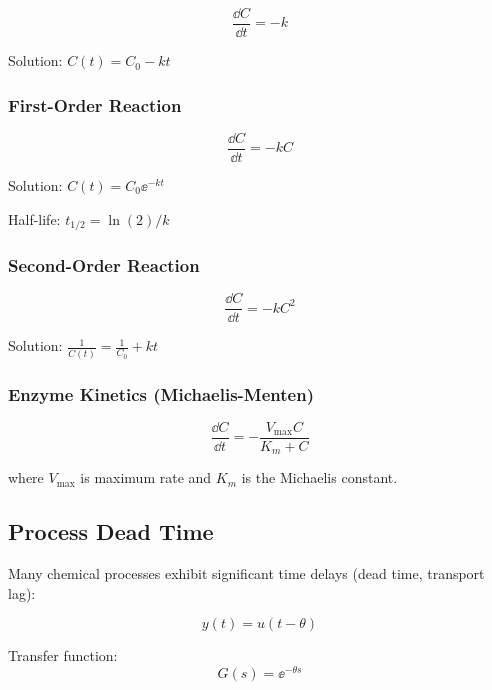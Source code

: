 \begin{equation}
\frac{\dd C}{\dd t} = -k
\end{equation}

Solution: $C(t) = C_0 - kt$

\subsubsection{First-Order Reaction}

\begin{equation}
\frac{\dd C}{\dd t} = -kC
\end{equation}

Solution: $C(t) = C_0\ee^{-kt}$

Half-life: $t_{1/2} = \ln(2)/k$

\subsubsection{Second-Order Reaction}

\begin{equation}
\frac{\dd C}{\dd t} = -kC^2
\end{equation}

Solution: $\frac{1}{C(t)} = \frac{1}{C_0} + kt$

\subsubsection{Enzyme Kinetics (Michaelis-Menten)}

\begin{equation}
\frac{\dd C}{\dd t} = -\frac{V_{\max}C}{K_m + C}
\end{equation}

where $V_{\max}$ is maximum rate and $K_m$ is the Michaelis constant.

\subsection{Process Dead Time}
\label{subsec:dead_time}

Many chemical processes exhibit significant time delays (dead time, transport lag):

\begin{equation}
y(t) = u(t - \theta)
\end{equation}

Transfer function:
\begin{equation}
G(s) = \ee^{-\theta s}
\end{equation}

